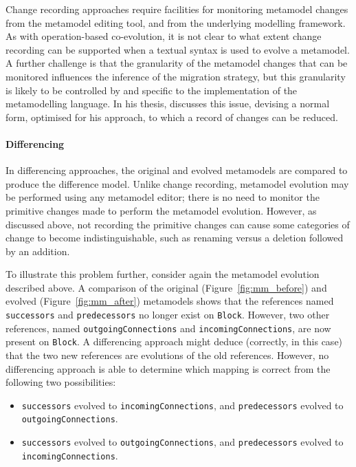 Change recording approaches require facilities for monitoring metamodel changes from the metamodel editing tool, and from the underlying modelling framework. As with operation-based co-evolution, it is not clear to what extent change recording can be supported when a textual syntax is used to evolve a metamodel. A further challenge is that the granularity of the metamodel changes that can be monitored influences the inference of the migration strategy, but this granularity is likely to be controlled by and specific to the implementation of the metamodelling language. In his thesis, \cite{cicchetti08thesis} discusses this issue, devising a normal form, optimised for his approach, to which a record of changes can be reduced.


\paragraph{Differencing}
In differencing approaches, the original and evolved metamodels are compared to produce the difference model. Unlike change recording, metamodel evolution may be performed using any metamodel editor; there is no need to monitor the primitive changes made to perform the metamodel evolution. However, as discussed above, not recording the primitive changes can cause some categories of change to become indistinguishable, such as renaming versus a deletion followed by an addition.

To illustrate this problem further, consider again the metamodel evolution described above. A comparison of the original (Figure~\ref{fig:mm_before}) and evolved (Figure~\ref{fig:mm_after}) metamodels shows that the references named \texttt{successors} and \texttt{predecessors} no longer exist on \texttt{Block}. However, two other references, named \texttt{out\-go\-ingCon\-nect\-ions} and \texttt{incomingConnections}, are now present on \texttt{Block}. A differencing approach might deduce (correctly, in this case) that the two new references are evolutions of the old references. However, no differencing approach is able to determine which mapping is correct from the following two possibilities:

\begin{itemize}
	\item \texttt{successors} evolved to \texttt{incomingConnections}, and \texttt{predecessors} evolved to \texttt{outgoingConnections}.
	\item \texttt{successors} evolved to \texttt{outgoingConnections}, and \texttt{predecessors} evolved to \texttt{incomingConnections}.
\end{itemize}

